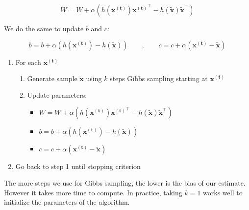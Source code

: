 \documentclass{article}
\begin{document}
\[ W = W + \alpha \left( h(\mathbf{x^{(t)}})\mathbf{x^{(t)}}^\top - h(\mathbf{\tilde x})\mathbf{\tilde x}^\top \right) \]

We do the same to update $b$ and $c$:

\[ b = b + \alpha \left(h(\mathbf{x^{(t)}}) - h(\mathbf{\tilde x}) \right)  ~~~~~~~~~,~~~~~~~~~ c = c + \alpha \left(\mathbf{x^{(t)}} - \mathbf{\tilde x} \right)\]


\begin{enumerate}
    \item For each $\mathbf{x^{(t)}}$
    \begin{enumerate}
        \item Generate sample $ \tilde{\mathbf{x}} $ using $ k $ steps Gibbs sampling starting at $\mathbf{x^{(t)}}$
        \item Update parameters:
        \begin{itemize}
            \item $ W = W + \alpha \left( h(\mathbf{x^{(t)}})\mathbf{x^{(t)}}^\top - h(\mathbf{\tilde x})\mathbf{\tilde x}^\top \right) $
            \item $ b = b + \alpha \left(h(\mathbf{x^{(t)}}) - h(\mathbf{\tilde x}) \right) $
            \item $ c = c + \alpha \left(\mathbf{x^{(t)}} - \mathbf{\tilde x} \right) $
        \end{itemize}
    \end{enumerate}
    \item Go back to step 1 until stopping criterion
\end{enumerate}

The more steps we use for Gibbs sampling, the lower is the bias of our estimate. However it takes more time to compute. In practice, taking $k=1$ works well to initialize the parameters of the algorithm.



\end{document}
